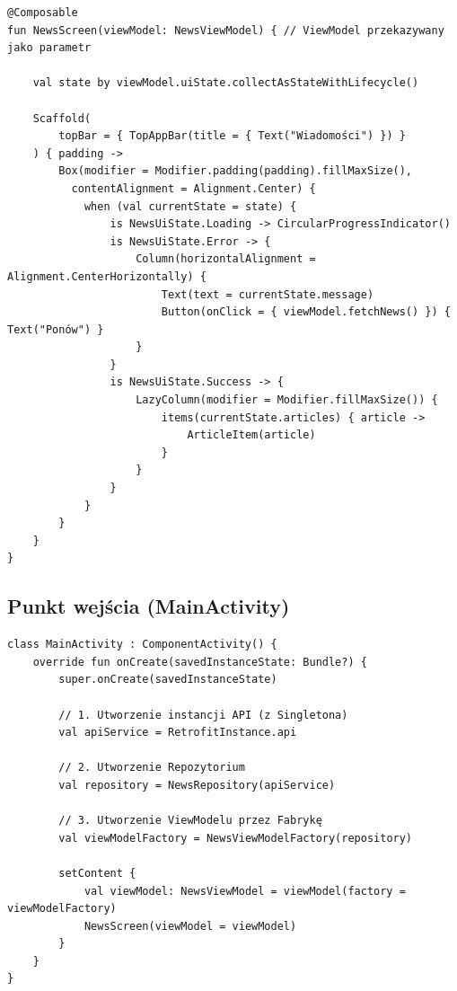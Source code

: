 \begin{verbatim}
@Composable
fun NewsScreen(viewModel: NewsViewModel) { // ViewModel przekazywany jako parametr
    
    val state by viewModel.uiState.collectAsStateWithLifecycle()

    Scaffold(
        topBar = { TopAppBar(title = { Text("Wiadomości") }) }
    ) { padding ->
        Box(modifier = Modifier.padding(padding).fillMaxSize(), 
          contentAlignment = Alignment.Center) {
            when (val currentState = state) {
                is NewsUiState.Loading -> CircularProgressIndicator()
                is NewsUiState.Error -> {
                    Column(horizontalAlignment = Alignment.CenterHorizontally) {
                        Text(text = currentState.message)
                        Button(onClick = { viewModel.fetchNews() }) { Text("Ponów") }
                    }
                }
                is NewsUiState.Success -> {
                    LazyColumn(modifier = Modifier.fillMaxSize()) {
                        items(currentState.articles) { article ->
                            ArticleItem(article)
                        }
                    }
                }
            }
        }
    }
}
\end{verbatim}

\subsection{Punkt wejścia (MainActivity)}

\begin{verbatim}
class MainActivity : ComponentActivity() {
    override fun onCreate(savedInstanceState: Bundle?) {
        super.onCreate(savedInstanceState)
        
        // 1. Utworzenie instancji API (z Singletona)
        val apiService = RetrofitInstance.api
        
        // 2. Utworzenie Repozytorium
        val repository = NewsRepository(apiService)
        
        // 3. Utworzenie ViewModelu przez Fabrykę
        val viewModelFactory = NewsViewModelFactory(repository)

        setContent {
            val viewModel: NewsViewModel = viewModel(factory = viewModelFactory)
            NewsScreen(viewModel = viewModel)
        }
    }
}
\end{verbatim}


